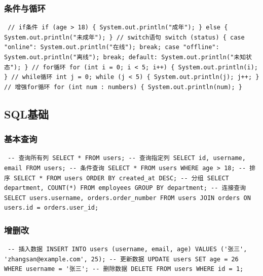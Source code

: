 \subsubsection{条件与循环}\label{ux6761ux4ef6ux4e0eux5faaux73af-2} \begin{verbatim} // if条件 if (age > 18) { System.out.println("成年"); } else { System.out.println("未成年"); } // switch语句 switch (status) { case "online": System.out.println("在线"); break; case "offline": System.out.println("离线"); break; default: System.out.println("未知状态"); } // for循环 for (int i = 0; i < 5; i++) { System.out.println(i); } // while循环 int j = 0; while (j < 5) { System.out.println(j); j++; } // 增强for循环 for (int num : numbers) { System.out.println(num); } \end{verbatim} \subsection{SQL基础}\label{sqlux57faux7840} \subsubsection{基本查询}\label{ux57faux672cux67e5ux8be2} \begin{verbatim} -- 查询所有列 SELECT * FROM users; -- 查询指定列 SELECT id, username, email FROM users; -- 条件查询 SELECT * FROM users WHERE age > 18; -- 排序 SELECT * FROM users ORDER BY created_at DESC; -- 分组 SELECT department, COUNT(*) FROM employees GROUP BY department; -- 连接查询 SELECT users.username, orders.order_number FROM users JOIN orders ON users.id = orders.user_id; \end{verbatim} \subsubsection{增删改}\label{ux589eux5220ux6539} \begin{verbatim} -- 插入数据 INSERT INTO users (username, email, age) VALUES ('张三', 'zhangsan@example.com', 25); -- 更新数据 UPDATE users SET age = 26 WHERE username = '张三'; -- 删除数据 DELETE FROM users WHERE id = 1; \end{verbatim}